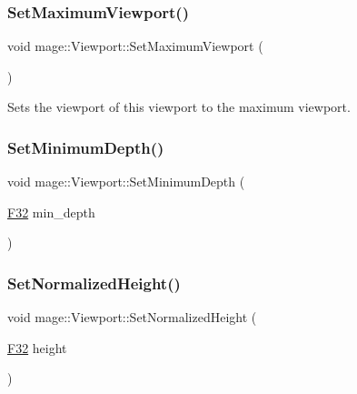 \hypertarget{structmage_1_1_viewport_a5af006b8ec0464a924c3822265727ee2}{}\label{structmage_1_1_viewport_a5af006b8ec0464a924c3822265727ee2} 
\subsubsection{\texorpdfstring{Set\+Maximum\+Viewport()}{SetMaximumViewport()}}
{\footnotesize\ttfamily void mage\+::\+Viewport\+::\+Set\+Maximum\+Viewport (\begin{DoxyParamCaption}{ }\end{DoxyParamCaption})\hspace{0.3cm}{\ttfamily [noexcept]}}

Sets the viewport of this viewport to the maximum viewport. \hypertarget{structmage_1_1_viewport_a7e5ea28ca50be25d48668bd8ce4995d5}{}\label{structmage_1_1_viewport_a7e5ea28ca50be25d48668bd8ce4995d5} 
\subsubsection{\texorpdfstring{Set\+Minimum\+Depth()}{SetMinimumDepth()}}
{\footnotesize\ttfamily void mage\+::\+Viewport\+::\+Set\+Minimum\+Depth (\begin{DoxyParamCaption}\item[{\hyperlink{namespacemage_aa97e833b45f06d60a0a9c4fc22ae02c0}{F32}}]{min\+\_\+depth }\end{DoxyParamCaption})\hspace{0.3cm}{\ttfamily [noexcept]}}

\hypertarget{structmage_1_1_viewport_ad1516859277f8d872ce59e24dd525d5d}{}\label{structmage_1_1_viewport_ad1516859277f8d872ce59e24dd525d5d} 
\subsubsection{\texorpdfstring{Set\+Normalized\+Height()}{SetNormalizedHeight()}}
{\footnotesize\ttfamily void mage\+::\+Viewport\+::\+Set\+Normalized\+Height (\begin{DoxyParamCaption}\item[{\hyperlink{namespacemage_aa97e833b45f06d60a0a9c4fc22ae02c0}{F32}}]{height }\end{DoxyParamCaption})\hspace{0.3cm}{\ttfamily [noexcept]}}

